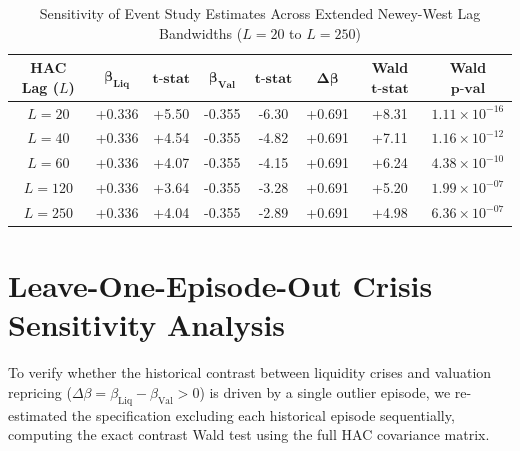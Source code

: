 \documentclass[12pt]{article}
\begin{document}
\begin{table}[htbp]
\centering
\caption{Sensitivity of Event Study Estimates Across Extended Newey-West Lag Bandwidths ($L=20$ to $L=250$)}
\label{tab:app_hac_sensitivity}
\begin{tabular}{cccccccc}
\toprule
\textbf{HAC Lag ($L$)} & $\mathbf{\beta_{\text{Liq}}}$ & $\mathbf{t\text{-stat}}$ & $\mathbf{\beta_{\text{Val}}}$ & $\mathbf{t\text{-stat}}$ & $\mathbf{\Delta \beta}$ & \textbf{Wald } $\mathbf{t\text{-stat}}$ & \textbf{Wald } $\mathbf{p\text{-val}}$ \\
\midrule
$L = 20$  & +0.336 & +5.50 & -0.355 & -6.30 & +0.691 & +8.31 & $1.11 \times 10^{-16}$ \\
$L = 40$  & +0.336 & +4.54 & -0.355 & -4.82 & +0.691 & +7.11 & $1.16 \times 10^{-12}$ \\
$L = 60$  & +0.336 & +4.07 & -0.355 & -4.15 & +0.691 & +6.24 & $4.38 \times 10^{-10}$ \\
$L = 120$ & +0.336 & +3.64 & -0.355 & -3.28 & +0.691 & +5.20 & $1.99 \times 10^{-07}$ \\
$L = 250$ & +0.336 & +4.04 & -0.355 & -2.89 & +0.691 & +4.98 & $6.36 \times 10^{-07}$ \\
\bottomrule
\end{tabular}
\end{table}

\section{Leave-One-Episode-Out Crisis Sensitivity Analysis}
\label{app:leave_one_out}

To verify whether the historical contrast between liquidity crises and valuation repricing ($\Delta \beta = \beta_{\text{Liq}} - \beta_{\text{Val}} > 0$) is driven by a single outlier episode, we re-estimated the specification excluding each historical episode sequentially, computing the exact contrast Wald test using the full HAC covariance matrix.
\end{document}
